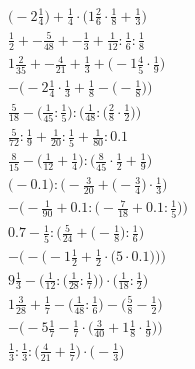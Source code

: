 \documentclass[8pt]{article}
\begin{document}
\begin{align}
\big(-2\frac{1}{4}\big) + \frac{1}{4} \cdot \big(1\frac{2}{6} \cdot \frac{1}{8} + \frac{1}{3}\big) \\
\frac{1}{2} + -\frac{5}{48} + -\frac{1}{3} + \frac{1}{12} : \frac{1}{6} : \frac{1}{8} \\
1\frac{2}{35} + -\frac{4}{21} + \frac{1}{3} + \big(-1\frac{4}{5} \cdot \frac{1}{9}\big) \\
-\Big(-2\frac{1}{4} \cdot \frac{1}{3} + \frac{1}{8} - \big(-\frac{1}{8}\big)\Big) \\
\frac{5}{18} - \Big(\frac{1}{45} : \frac{1}{5}\Big) : \Big(\frac{1}{48} : \big(\frac{2}{8} \cdot \frac{1}{2}\big)\Big) \\
\frac{5}{72} : \frac{1}{9} + \frac{1}{20} : \frac{1}{5} + \frac{1}{80} : 0.1 \\
\frac{8}{15} - \big(\frac{1}{12} + \frac{1}{4}\big) : \big(\frac{8}{45} \cdot \frac{1}{2} + \frac{1}{9}\big) \\
\Big(-0.1\Big) : \Big(-\frac{3}{20} + \big(-\frac{3}{4}\big) \cdot \frac{1}{3}\Big) \\
-\Big(-\frac{1}{90} + 0.1 : \big(-\frac{7}{18} + 0.1 : \frac{1}{5}\big)\Big) \\
0.7 - \frac{1}{5} : \Big(\frac{5}{24} + \big(-\frac{1}{8}\big) : \frac{1}{6}\Big) \\
-\bigg(-\Big(-1\frac{1}{2} + \frac{1}{2} \cdot \big(5 \cdot 0.1\big)\Big)\bigg) \\
9\frac{1}{3} - \Big(\frac{1}{12} : \big(\frac{1}{28} : \frac{1}{7}\big)\Big) \cdot \Big(\frac{1}{18} : \frac{1}{2}\Big) \\
1\frac{3}{28} + \frac{1}{7} - \big(\frac{1}{48} : \frac{1}{6}\big) - \big(\frac{5}{8} - \frac{1}{2}\big) \\
-\Big(-5\frac{1}{7} - \frac{1}{7} \cdot \big(\frac{3}{40} + 1\frac{1}{8} \cdot \frac{1}{9}\big)\Big) \\
\frac{1}{3} : \frac{1}{3} : \big(\frac{4}{21} + \frac{1}{7}\big) \cdot \big(-\frac{1}{3}\big)
\end{align}
\end{document}
